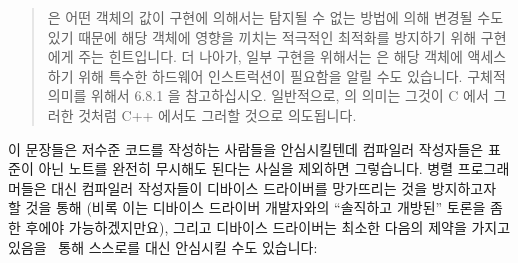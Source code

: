 \begin{quote}
	 은 어떤 객체의 값이 구현에 의해서는 탐지될 수 없는
	방법에 의해 변경될 수도 있기 때문에 해당 객체에 영향을 끼치는 적극적인
	최적화를 방지하기 위해 구현에게 주는 힌트입니다.
	더 나아가, 일부 구현을 위해서는  은 해당 객체에 액세스
	하기 위해 특수한 하드웨어 인스트럭션이 필요함을 알릴 수도 있습니다.
	구체적 의미를 위해서 6.8.1 을 참고하십시오.
	일반적으로,  의 의미는 그것이 C 에서 그러한 것처럼 C++
	에서도 그러할 것으로 의도됩니다.
\end{quote}

이 문장들은 저수준 코드를 작성하는 사람들을 안심시킬텐데 컴파일러 작성자들은
표준이 아닌 노트를 완전히 무시해도 된다는 사실을 제외하면 그렇습니다.
병렬 프로그래머들은 대신 컴파일러 작성자들이 디바이스 드라이버를 망가뜨리는
것을 방지하고자 할 것을 통해 (비록 이는 디바이스 드라이버 개발자와의 ``솔직하고
개방된'' 토론을 좀 한 후에야 가능하겠지만요), 그리고 디바이스 드라이버는 최소한
다음의 제약을 가지고 있음을~\cite{PaulEMcKenney2016P0124R6-LKMM} 통해 스스로를
대신 안심시킬 수도 있습니다:

